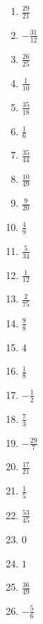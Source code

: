 \begin{Answer}[ref=bruecheA1]
	\begin{minipage}{\textwidth}
		\begin{minipage}{0.46\textwidth}
			\begin{enumerate}[label=\alph*)]
				\item \(\frac{29}{21}\)
				\item \(-\frac{31}{12}\)
				\item \(\frac{26}{25}\)
				\item \(\frac{1}{10}\)
				\item \(\frac{35}{18}\)
				\item \(\frac{1}{6}\)
				\item \(\frac{35}{44}\)
				\item \(\frac{10}{49}\)
				\item \(\frac{9}{20}\)
				\item \(\frac{4}{9}\)
				\item \(\frac{5}{34}\)
				\item \(\frac{1}{12}\)
				\item \(\frac{2}{75}\)
			\end{enumerate}
		\end{minipage}%
		\begin{minipage}{0.54\textwidth}
			\begin{enumerate}[label=\alph*)]
				\setcounter{enumi}{13}
				\item \(\frac{9}{8}\)
				\item \(4\)
				\item \(\frac{1}{8}\)
				\item \(-\frac{1}{2}\)
				\item \(\frac{7}{3}\)
				\item \(-\frac{29}{7}\)
				\item \(\frac{17}{21}\)
				\item \(\frac{1}{5}\)
				\item \(\frac{53}{45}\)
				\item \(0\)
				\item \(1\)
				\item \(\frac{36}{49}\)
				\item \(-\frac{5}{6}\)
			\end{enumerate}
		\end{minipage}%
	\end{minipage}%
\end{Answer}
\newpage

